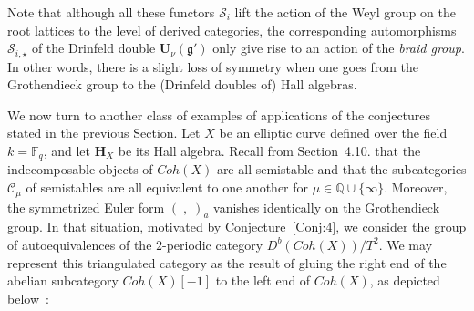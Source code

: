 \documentclass[a4paper,10pt]{amsart}
\def\H{\mathbf{H}}
\def\U{\mathbf{U}}
\def\g{\mathfrak{g}}
\numberwithin{equation}{section}
\begin{document}
{\vspace{.5in}

Note that although all these functors $\mathcal{S}_i$ lift the action of the Weyl group on the root lattices to the level of derived categories, the corresponding automorphisms $\mathcal{S}_{i,\star}$ of the Drinfeld double $\U_\nu(\g')$ only give rise to an action of the \textit{braid group}. In other words, there is a slight loss of symmetry when one goes from the Grothendieck group to the (Drinfeld doubles of) Hall algebras.

\vspace{.2in}

We now turn to another class of examples of applications of the conjectures stated in the previous Section. Let $X$ be an elliptic curve defined over the field $k=\mathbb{F}_q$, and let $\H_X$ be its Hall algebra. Recall from Section~4.10. that the indecomposable objects of $Coh(X)$ are all semistable and that the subcategories $\mathcal{C}_\mu$ of semistables are all equivalent to one another for $\mu \in \mathbb{Q} \cup \{\infty\}$. Moreover, the symmetrized Euler form $(\;,\;)_a$ vanishes identically on the Grothendieck group. In that situation, motivated by Conjecture~\ref{Conj:4}, we consider the group of autoequivalences of the $2$-periodic category $D^b(Coh(X))/T^2$. We may represent this triangulated category as the result of gluing the right end of the abelian subcategory $Coh(X)[-1]$ to the left end of
$Coh(X)$, as depicted below~:

\vspace{.3in}

}
\end{document}
